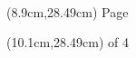 \documentclass[a4paper,11pt]{article}
\begin{document}
\\
\\
\\
\\
\\
\\
\\
\\
\\
\\
\begin{figure}[ht]
\par\\
\end{figure}
\begin{textblock*}{5cm}(8.9cm,28.49cm)
Page
\end{textblock*}
\begin{textblock*}{5cm}(10.1cm,28.49cm)
of 4
\end{textblock*}
\end{document}
